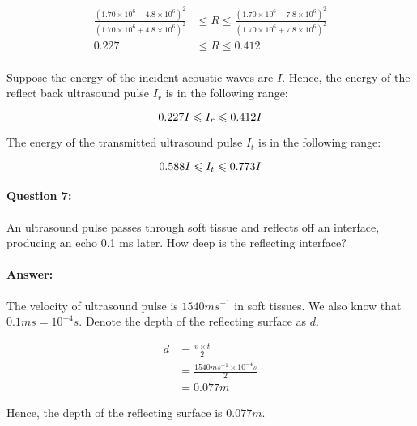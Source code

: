 \documentclass[12pt, letter]{article}
\begin{document}
\begin{equation}
\begin{split}
\frac{(1.70 \times 10^6 - 4.8 \times 10^6)^2}{(1.70 \times 10^6 + 4.8 \times 10^6)^2} & \leqslant R \leqslant \frac{(1.70 \times 10^6 - 7.8 \times 10^6)^2}{(1.70 \times 10^6 + 7.8 \times 10^6)^2} \\
0.227 & \leqslant R \leqslant 0.412 \\
\end{split}
\end{equation}

Suppose the energy of the incident acoustic waves are $I$. Hence, the energy of the reflect back ultrasound pulse $I_{r}$ is in the following range:

\begin{equation}
0.227I \leqslant I_{r} \leqslant 0.412I\\
\end{equation}

The energy of the transmitted ultrasound pulse $I_t$ is in the following range:

\begin{equation}
0.588I \leqslant I_{t} \leqslant 0.773I\\
\end{equation}

\paragraph{Question 7: } An ultrasound pulse passes through soft tissue and reflects off an interface, producing an echo 0.1 ms later. How deep is the reflecting interface?

\paragraph{Answer: } The velocity of ultrasound pulse is $1540 ms^{-1}$ in soft tissues. We also know that $0.1ms = 10^{-4}s$. Denote the depth of the reflecting surface as $d$.

\begin{equation}
\begin{split}
        d & = \frac{v\times t}{2} \\
          & = \frac{1540 ms^{-1} \times 10^{-4}s}{2} \\
          & = 0.077m
\end{split}
\end{equation}

Hence, the depth of the reflecting surface is $0.077 m$.
\end{document}
